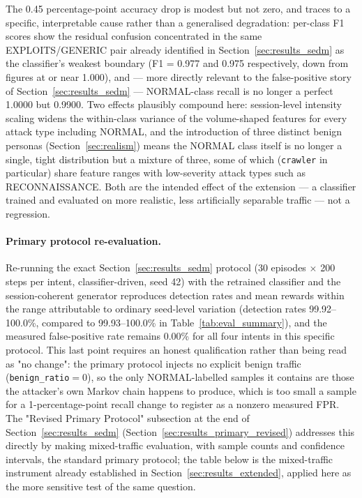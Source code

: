 The 0.45 percentage-point accuracy drop is modest but not zero, and traces
to a specific, interpretable cause rather than a generalised degradation:
per-class F1 scores show the residual confusion concentrated in the same
EXPLOITS/GENERIC pair already identified in Section~\ref{sec:results_sedm}
as the classifier's weakest boundary (F1 = 0.977 and 0.975 respectively,
down from figures at or near 1.000), and — more directly relevant to the
false-positive story of Section~\ref{sec:results_sedm} — NORMAL-class
recall is no longer a perfect 1.0000 but 0.9900. Two effects plausibly
compound here: session-level intensity scaling widens the within-class
variance of the volume-shaped features for every attack type including
NORMAL, and the introduction of three distinct benign personas
(Section~\ref{sec:realism}) means the NORMAL class itself is no longer a
single, tight distribution but a mixture of three, some of which
(\texttt{crawler} in particular) share feature ranges with low-severity
attack types such as RECONNAISSANCE. Both are the intended effect of the
extension — a classifier trained and evaluated on more realistic, less
artificially separable traffic — not a regression.

\paragraph{Primary protocol re-evaluation.}
Re-running the exact Section~\ref{sec:results_sedm} protocol (30 episodes
$\times$ 200 steps per intent, classifier-driven, seed 42) with the
retrained classifier and the session-coherent generator reproduces
detection rates and mean rewards within the range attributable to ordinary
seed-level variation (detection rates 99.92--100.0\%, compared to
99.93--100.0\% in Table~\ref{tab:eval_summary}), and the measured
false-positive rate remains 0.00\% for all four intents in this specific
protocol. This last point requires an honest qualification rather than
being read as "no change": the primary protocol injects no explicit benign
traffic (\texttt{benign\_ratio}$=0$), so the only NORMAL-labelled samples it
contains are those the attacker's own Markov chain happens to produce,
which is too small a sample for a 1-percentage-point recall change to
register as a nonzero measured FPR. The "Revised Primary Protocol"
subsection at the end of Section~\ref{sec:results_sedm}
(Section~\ref{sec:results_primary_revised}) addresses this directly by
making mixed-traffic evaluation, with sample counts and confidence
intervals, the standard primary protocol; the table below is the
mixed-traffic instrument already established in
Section~\ref{sec:results_extended}, applied here as the more sensitive test
of the same question.

